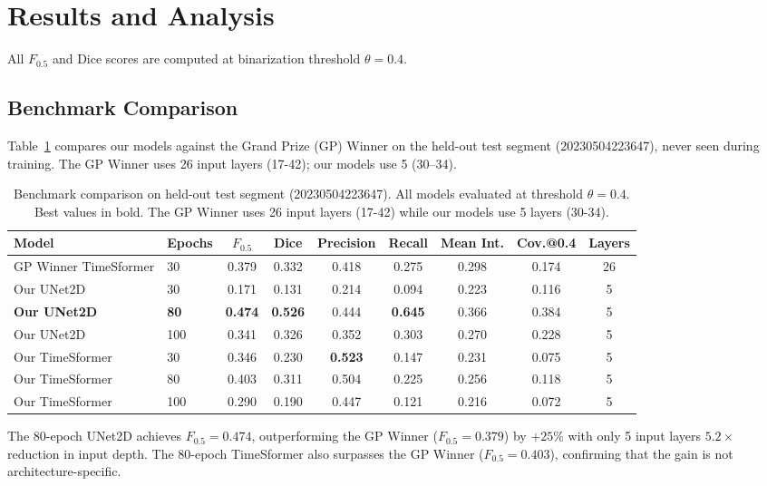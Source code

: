 
\section{Results and Analysis}
\label{sec:results}

All $F_{0.5}$ and Dice scores are computed at binarization threshold $\theta = 0.4$.

\subsection{Benchmark Comparison}

Table~\ref{tab:benchmark} compares our models against the Grand Prize (GP) Winner on the held-out test segment (20230504223647), never seen during training. The GP Winner uses 26 input layers (17-42); our models use 5 (30--34).

\begin{table}[t]
\centering
\caption{Benchmark comparison on held-out test segment (20230504223647). All models evaluated at threshold $\theta = 0.4$. Best values in bold. The GP Winner uses 26 input layers (17-42) while our models use 5 layers (30-34).}
\label{tab:benchmark}
\begin{tabular}{llccccccc}
\hline
\textbf{Model} & \textbf{Epochs} & \textbf{$F_{0.5}$} & \textbf{Dice} & \textbf{Precision} & \textbf{Recall} & \textbf{Mean Int.} & \textbf{Cov.@0.4} & \textbf{Layers} \\
\hline
GP Winner TimeSformer  & 30 & 0.379 & 0.332 & 0.418 & 0.275 & 0.298 & 0.174 & 26 \\
\hline
Our UNet2D             & 30  & 0.171 & 0.131 & 0.214 & 0.094 & 0.223 & 0.116 & 5 \\
\textbf{Our UNet2D}    & \textbf{80}  & \textbf{0.474} & \textbf{0.526} & 0.444 & \textbf{0.645} & 0.366 & 0.384 & 5 \\
Our UNet2D             & 100 & 0.341 & 0.326 & 0.352 & 0.303 & 0.270 & 0.228 & 5 \\
\hline
Our TimeSformer        & 30  & 0.346 & 0.230 & \textbf{0.523} & 0.147 & 0.231 & 0.075 & 5 \\
Our TimeSformer        & 80  & 0.403 & 0.311 & 0.504 & 0.225 & 0.256 & 0.118 & 5 \\
Our TimeSformer        & 100 & 0.290 & 0.190 & 0.447 & 0.121 & 0.216 & 0.072 & 5 \\
\hline
\end{tabular}
\end{table}

The 80-epoch UNet2D achieves $F_{0.5} = 0.474$, outperforming the GP Winner ($F_{0.5} = 0.379$) by $+25\%$ with only 5 input layers $5.2\times$ reduction in input depth. The 80-epoch TimeSformer also surpasses the GP Winner ($F_{0.5} = 0.403$), confirming that the gain is not architecture-specific.

